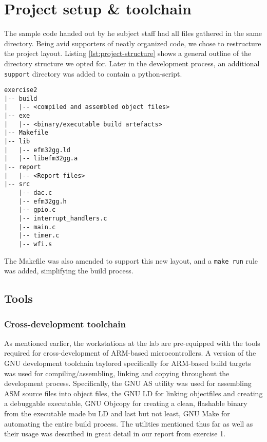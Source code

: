 \section{Project setup \& toolchain}

The sample code handed out by he subject staff had all files gathered in the same directory. Being avid supporters of neatly organized code, we chose to restructure the project layout. Listing \ref{lst:project-structure} shows a general outline of the directory structure we opted for. Later in the development process, an additional \texttt{support} directory was added to contain a python-script.

\begin{lstlisting}[label=lst:project-structure, caption=Revised project structure]
exercise2
|-- build
|   |-- <compiled and assembled object files>
|-- exe
|   |-- <binary/executable build artefacts>
|-- Makefile
|-- lib
|   |-- efm32gg.ld
|   |-- libefm32gg.a
|-- report
|   |-- <Report files>
|-- src
    |-- dac.c
    |-- efm32gg.h
    |-- gpio.c
    |-- interrupt_handlers.c
    |-- main.c
    |-- timer.c
    |-- wfi.s
\end{lstlisting}

The Makefile was also amended to support this new layout, and a \texttt{make run} rule was added, simplifying the build process.

\subsection{Tools}

\subsubsection{Cross-development toolchain}

As mentioned earlier, the workstations at the lab are pre-equipped with the tools required for cross-development of ARM-based microcontrollers. A version of the GNU development toolchain taylored specifically for ARM-based build targets was used for compiling/assembling, linking and copying throughout the development process. Specifically, the GNU AS \cite[p.~4]{exercise1report} utility was used for assembling ASM source files into object files, the GNU LD \cite[p.~4]{exercise1report} for linking objectfiles and creating a debuggable executable, GNU Objcopy \cite[p.~5]{exercise1report} for creating a clean, flashable binary from the executable made bu LD and last but not least, GNU Make \cite[p.~5]{exercise1report} for automating the entire build process. The utilities mentioned thus far as well as their usage was described in great detail in our report from exercise 1.


